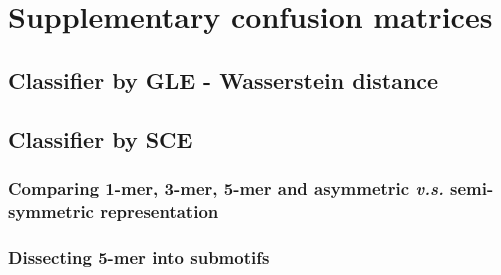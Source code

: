 \section{Supplementary confusion matrices}
\subsection{Classifier by GLE - Wasserstein distance}


\newpage
\subsection{Classifier by SCE}

\subsubsection{Comparing 1-mer, 3-mer, 5-mer and asymmetric \textit{v.s.} semi-symmetric representation}


\subsubsection{Dissecting 5-mer into submotifs}
